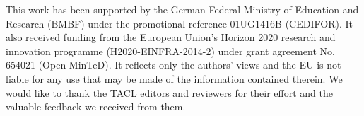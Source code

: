 \documentclass[11pt,letterpaper]{article}
\begin{document}
This work has been supported by the German Federal Ministry of Education and Research (BMBF) 
under the promotional reference 01UG1416B (CEDIFOR).
It also received funding from the European Union’s
Horizon 2020 research and innovation programme (H2020-EINFRA-2014-2) under grant agreement No. 654021 
(Open-MinTeD). It reflects only the authors’ views and the EU is 
not liable for any use that may be made of the information contained therein. 
We would like to thank the TACL editors and reviewers for their effort and the valuable feedback we received from them.




\end{document}
